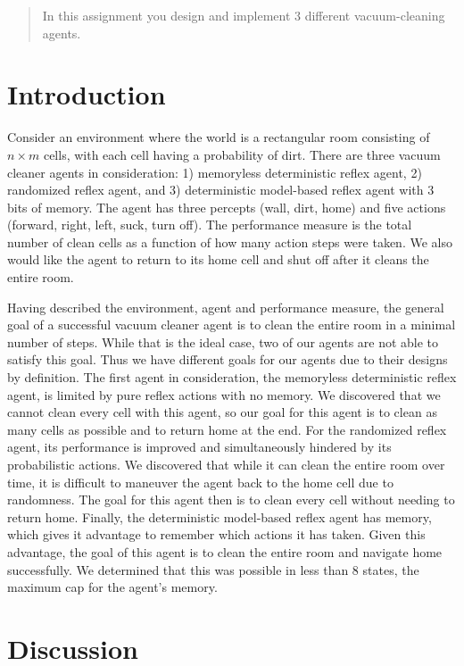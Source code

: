 \documentclass[12pt]{article}
\begin{document}
\maketitle

\begin{abstract}
In this assignment you design and implement 3 different vacuum-cleaning agents.
\end{abstract}

\section{Introduction}

Consider an environment where the world is a rectangular room consisting of $ n \times m $ cells, with each cell having a probability of dirt. There are three vacuum cleaner agents in consideration: 1) memoryless deterministic reflex agent, 2) randomized reflex agent, and 3) deterministic model-based reflex agent with 3 bits of memory. The agent has three percepts (wall, dirt, home) and five actions (forward, right, left, suck, turn off). The performance measure is the total number of clean cells as a function of how many action steps were taken. We also would like the agent to return to its home cell and shut off after it cleans the entire room.

Having described the environment, agent and performance measure, the general goal of a successful vacuum cleaner agent is to clean the entire room in a minimal number of steps. While that is the ideal case, two of our agents are not able to satisfy this goal. Thus we have different goals for our agents due to their designs by definition. The first agent in consideration, the memoryless deterministic reflex agent, is limited by pure reflex actions with no memory. We discovered that we cannot clean every cell with this agent, so our goal for this agent is to clean as many cells as possible and to return home at the end. For the randomized reflex agent, its performance is improved and simultaneously hindered by its probabilistic actions. We discovered that while it can clean the entire room over time, it is difficult to maneuver the agent back to the home cell due to randomness. The goal for this agent then is to clean every cell without needing to return home. Finally, the deterministic model-based reflex agent has memory, which gives it advantage to remember which actions it has taken. Given this advantage, the goal of this agent is to clean the entire room and navigate home successfully. We determined that this was possible in less than 8 states, the maximum cap for the agent's memory.






\section{Discussion}



\end{document}
